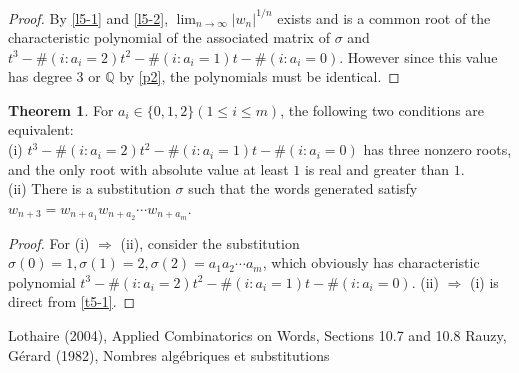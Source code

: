 \documentclass{article}
\theoremstyle{definition}
\newtheorem{theorem}{Theorem}
\begin{document}
\begin{proof}
By \cref{l5-1} and \cref{l5-2}, $\lim_{n\rightarrow\infty}|w_n|^{1/n}$ exists and is a common root of the characteristic polynomial of the associated matrix of $\sigma$ and $ t^3- \#(i:a_i=2)t^2-\#(i:a_i=1)t-\#(i:a_i=0)$. However since this value has degree $3$ or $\mathbb{Q}$ by \cref{p2}, the polynomials must be identical.
\end{proof}
\begin{theorem}
For $a_i\in\{0, 1, 2\}(1\leq i\leq m)$, the following two conditions are equivalent: \\
(i) $t^3- \#(i:a_i=2)t^2-\#(i:a_i=1)t-\#(i:a_i=0)$ has three nonzero roots, and the only root with absolute value at least $1$ is real and greater than $1$.\\
(ii) There is a substitution $\sigma$ such that the words generated satisfy $w_{n+3}=w_{n+a_1}w_{n+a_2}\cdots w_{n+a_m}$.
\end{theorem}
\begin{proof}
For (i) $\Rightarrow$ (ii), consider the substitution $\sigma(0)=1, \sigma(1)=2, \sigma(2)=a_1a_2\cdots a_m$, which obviously has characteristic polynomial $t^3- \#(i:a_i=2)t^2-\#(i:a_i=1)t-\#(i:a_i=0)$. (ii) $\Rightarrow$ (i) is direct from \cref{t5-1}.
\end{proof}
\label{sec5}
\begin{thebibliography}{9}
Lothaire (2004), Applied Combinatorics on Words, Sections 10.7 and 10.8
Rauzy, Gérard (1982), Nombres algébriques et substitutions
\end{thebibliography}
\end{document}
